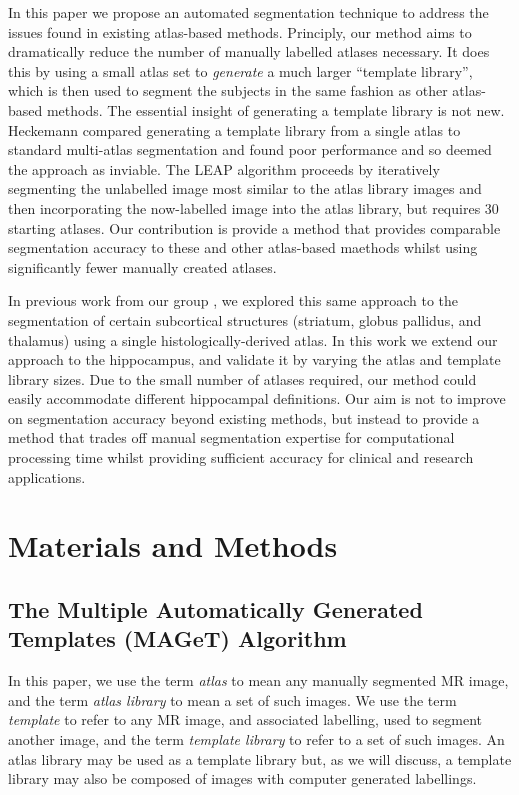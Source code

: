 \documentclass{article}
\begin{document}
In this paper we propose an automated segmentation technique to address the
issues found in existing atlas-based methods. Principly, our method aims to
dramatically reduce the number of manually labelled atlases necessary.  It does
this by using a small atlas set to {\it generate} a much larger ``template
library'', which is then used to segment the subjects in the same fashion as
other atlas-based methods.  The essential insight of generating a template
library is not new.  Heckemann \cite{Heckemann2006} compared generating a
template library from a single atlas to standard multi-atlas segmentation and
found poor performance and so deemed the approach as inviable.  The LEAP
algorithm \cite{Wolz2010} proceeds by iteratively segmenting the unlabelled
image most similar to the atlas library images and then incorporating the
now-labelled image into the atlas library, but requires 30 starting atlases.
Our contribution is provide a method that provides comparable segmentation
accuracy to these and other atlas-based maethods whilst using significantly
fewer manually created atlases.

In previous work from our group \cite{Chakravarty2011}, we explored
this same approach to the segmentation of certain subcortical structures (striatum,
globus pallidus, and thalamus) using a single histologically-derived atlas.
In this work we extend our approach to the hippocampus, and validate it by
varying the atlas and template library sizes.  Due to the small number of
atlases required, our method could easily accommodate different hippocampal
definitions.  Our aim is not to improve on segmentation accuracy beyond
existing methods, but instead to provide a method that trades off manual
segmentation expertise for computational processing time whilst providing
sufficient accuracy for clinical and research applications.

\section{Materials and Methods} 
\subsection{The Multiple Automatically Generated Templates (MAGeT) Algorithm}

In this paper, we use the term {\it atlas} to mean any manually segmented MR
image, and the term {\it atlas library} to mean a set of such images.  We use
the term {\it template} to refer to any MR image, and associated labelling,
used to segment another image, and the term {\it template library} to refer to
a set of such images.  An atlas library may be used as a template library but,
as we will discuss, a template library may also be composed of images with
computer generated labellings. 
\end{document}
